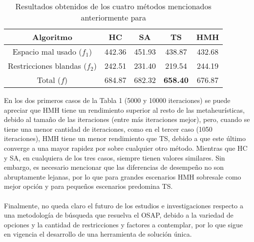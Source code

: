 \documentclass[letter, 10pt]{article}
\begin{document}
\begin{table}[H]
\begin{center}
\begin{tabular}{|c|cccc|}
    Algoritmo                    & \multicolumn{1}{c|}{HC}     & \multicolumn{1}{c|}{SA}     & \multicolumn{1}{c|}{TS}     & HMH             \\ \hline
    Espacio mal usado ($f_1$)     & \multicolumn{1}{c|}{442.36} & \multicolumn{1}{c|}{451.93} & \multicolumn{1}{c|}{438.87} & 432.68          \\ \hline
    Restricciones blandas ($f_2$) & \multicolumn{1}{c|}{242.51} & \multicolumn{1}{c|}{231.40} & \multicolumn{1}{c|}{219.54} & 244.19          \\ \hline
    Total ($f$)                    & \multicolumn{1}{c|}{684.87} & \multicolumn{1}{c|}{682.32} & \multicolumn{1}{c|}{\textbf{658.40}} & 676.87 \\ \hline
    \end{tabular}
    \caption{Resultados obtenidos de los cuatro m\'etodos mencionados anteriormente para \cite{lopes2010office}}
    \end{center}
    \label{tabla1}
\end{table}
\noindent
En los dos primeros casos de la Tabla 1 (5000 y 10000 iteraciones) se puede apreciar que HMH tiene un rendimiento superior al resto de las metaheur\'isticas, debido al tama\~no de las iteraciones (entre m\'as iteraciones mejor), pero, cuando se tiene una menor cantidad de iteraciones, como en el tercer caso (1050 iteraciones), HMH tiene un menor rendimiento que TS, debido a que este \'ultimo converge a una mayor rapidez por sobre cualquier otro m\'etodo. Mientras que HC y SA, en cualquiera de los tres casos, siempre tienen valores similares. Sin embargo, es necesario mencionar que las diferencias de desempe\~no no son abruptamente lejanas, por lo que para grandes escenarios HMH sobresale como mejor opci\'on y para peque\~nos escenarios predomina TS. \\
\noindent
\\
Finalmente, no queda claro el futuro de los estudios e investigaciones respecto a una metodolog\'ia de b\'usqueda que resuelva el OSAP, debido a la variedad de opciones y la cantidad de restricciones y factores a contemplar, por lo que sigue en vigencia el desarrollo de una herramienta de soluci\'on \'unica.

\end{document}
